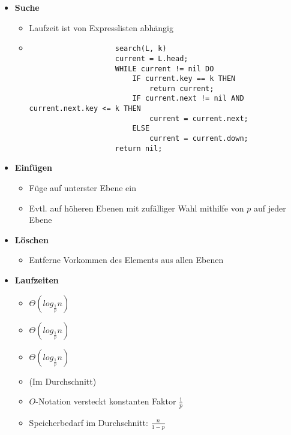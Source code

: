 \begin{itemize}
        \item \textbf{Suche}
            \begin{itemize}
                \item Laufzeit ist von Expresslisten abhängig
                \item[]
                    \begin{verbatim}
                    search(L, k)
                    current = L.head;
                    WHILE current != nil DO
                        IF current.key == k THEN 
                            return current;
                        IF current.next != nil AND current.next.key <= k THEN
                            current = current.next;
                        ELSE
                            current = current.down;
                    return nil;
                    \end{verbatim}
            \end{itemize}

        \item \textbf{Einfügen}
            \begin{itemize}
                \item Füge auf unterster Ebene ein
                \item Evtl. auf höheren Ebenen mit zufälliger Wahl mithilfe von $p$ auf jeder Ebene
            \end{itemize}

        \item \textbf{Löschen}
            \begin{itemize}
                \item Entferne Vorkommen des Elements aus allen Ebenen
            \end{itemize}
        
        \item \textbf{Laufzeiten}
            \begin{itemize}
                \item {} $\Theta(log_{\frac{1}{p}}n)$
                \item {} $\Theta(log_{\frac{1}{p}}n)$
                \item {} $\Theta(log_{\frac{1}{p}}n)$
                \item (Im Durchschnitt)
                \item $O$-Notation versteckt konstanten Faktor $\frac{1}{p}$
                \item Speicherbedarf im Durchschnitt: $\frac{n}{1-p}$
            \end{itemize}
    \end{itemize}

